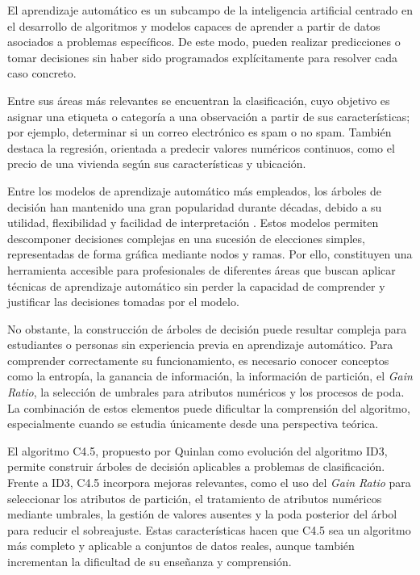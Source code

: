 
El aprendizaje automático \cite{bishop2006PatternRecognition} es un subcampo de la inteligencia artificial centrado en el desarrollo de algoritmos y modelos capaces de aprender a partir de datos asociados a problemas específicos. De este modo, pueden realizar predicciones o tomar decisiones sin haber sido programados explícitamente para resolver cada caso concreto.

Entre sus áreas más relevantes se encuentran la clasificación, cuyo objetivo es asignar una etiqueta o categoría a una observación a partir de sus características; por ejemplo, determinar si un correo electrónico es spam o no spam. También destaca la regresión, orientada a predecir valores numéricos continuos, como el precio de una vivienda según sus características y ubicación.

Entre los modelos de aprendizaje automático más empleados, los árboles de decisión han mantenido una gran popularidad durante décadas, debido a su utilidad, flexibilidad y facilidad de interpretación \cite{costa2023RecentAdvancesDecisionTrees}. Estos modelos permiten descomponer decisiones complejas en una sucesión de elecciones simples, representadas de forma gráfica mediante nodos y ramas. Por ello, constituyen una herramienta accesible para profesionales de diferentes áreas que buscan aplicar técnicas de aprendizaje automático sin perder la capacidad de comprender y justificar las decisiones tomadas por el modelo.

No obstante, la construcción de árboles de decisión puede resultar compleja para estudiantes o personas sin experiencia previa en aprendizaje automático. Para comprender correctamente su funcionamiento, es necesario conocer conceptos como la entropía, la ganancia de información, la información de partición, el \textit{Gain Ratio}, la selección de umbrales para atributos numéricos y los procesos de poda. La combinación de estos elementos puede dificultar la comprensión del algoritmo, especialmente cuando se estudia únicamente desde una perspectiva teórica.

El algoritmo C4.5, propuesto por Quinlan como evolución del algoritmo ID3, permite construir árboles de decisión aplicables a problemas de clasificación. Frente a ID3, C4.5 incorpora mejoras relevantes, como el uso del \textit{Gain Ratio} para seleccionar los atributos de partición, el tratamiento de atributos numéricos mediante umbrales, la gestión de valores ausentes y la poda posterior del árbol para reducir el sobreajuste. Estas características hacen que C4.5 sea un algoritmo más completo y aplicable a conjuntos de datos reales, aunque también incrementan la dificultad de su enseñanza y comprensión.

